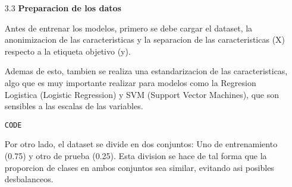 \documentclass{article}
\begin{document}
\bigskip

\begin{itemize}

\item[3.3]  {\bf Preparacion de los datos}

Antes de entrenar los modelos, primero se debe cargar el dataset, la anonimizacion de las caracteristicas y la separacion de las caracteristicas (X) respecto a la etiqueta objetivo (y). 

Ademas de esto, tambien se realiza una estandarizacion de las caracteristicas, algo que es muy importante realizar para modelos como la Regresion Logistica (Logistic Regression) y SVM (Support Vector Machines), que son sensibles a las escalas de las variables.

\begin{tcolorbox}[width=14cm]
\begin{scriptsize}
\begin{verbatim}
CODE
\end{verbatim}
\end{scriptsize}
\end{tcolorbox}

Por otro lado, el dataset se divide en dos conjuntos: Uno de entrenamiento (0.75) y otro de prueba (0.25). Esta division se hace de tal forma que la proporcion de clases en ambos conjuntos sea similar, evitando asi posibles desbalanceos.

\end{itemize}

\bigskip
\end{document}
